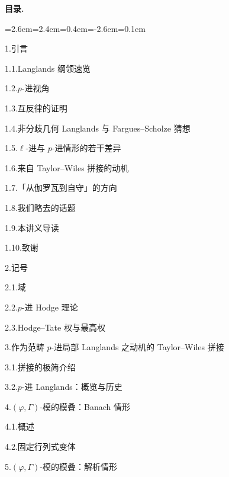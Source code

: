 \medskip
\noindent\textbf{目录.}
\begin{list}{}{\leftmargin=2.6em=2.4em=0.4em\itemindent=-2.6em\itemsep=0.1em}
\item 1.\quad 引言
\item 1.1.\quad Langlands 纲领速览
\item 1.2.\quad $p$-进视角
\item 1.3.\quad 互反律的证明
\item 1.4.\quad 非分歧几何 Langlands 与 Fargues--Scholze 猜想
\item 1.5.\quad $\ell$-进与 $p$-进情形的若干差异
\item 1.6.\quad 来自 Taylor--Wiles 拼接的动机
\item 1.7.\quad 「从伽罗瓦到自守」的方向
\item 1.8.\quad 我们略去的话题
\item 1.9.\quad 本讲义导读
\item 1.10.\quad 致谢
\item 2.\quad 记号
\item 2.1.\quad 域
\item 2.2.\quad $p$-进 Hodge 理论
\item 2.3.\quad Hodge--Tate 权与最高权
\item 3.\quad 作为范畴 $p$-进局部 Langlands 之动机的 Taylor--Wiles 拼接
\item 3.1.\quad 拼接的极简介绍
\item 3.2.\quad $p$-进 Langlands：概览与历史
\item 4.\quad $(\varphi,\Gamma)$-模的模叠：Banach 情形
\item 4.1.\quad [EG23] 概述
\item 4.2.\quad 固定行列式变体
\item 5.\quad $(\varphi,\Gamma)$-模的模叠：解析情形
\end{list}
